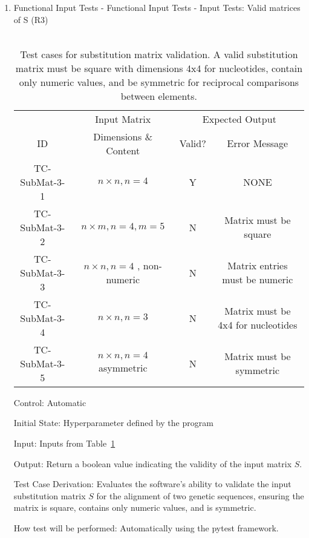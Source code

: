 \documentclass[12pt, titlepage]{article}
\begin{document}
\begin{enumerate}
\newpage

\item{Functional Input Tests - Functional Input Tests - Input Tests: Valid matrices of S (R3)\\\\}

\begin{table}[h]
  \begin{tabular}{|c|c|c c|}
  \hline 
    & Input Matrix & \multicolumn{2}{c|}{Expected Output} \\
  \cline{2-4}
  ID & Dimensions \& Content & Valid? & Error Message \\
  \hline
  TC-SubMat-3-1 & $n \times n, n=4$ & Y & NONE \\
  \hline
  TC-SubMat-3-2 & $n \times m, n=4, m=5$ & N & Matrix must be square \\
  \hline
  TC-SubMat-3-3 & $n \times n, n=4$ , non-numeric & N & Matrix entries must be numeric \\
  \hline
  TC-SubMat-3-4 & $n \times n, n=3$ & N & Matrix must be 4x4 for nucleotides \\
  \hline
  TC-SubMat-3-5 & $n \times n, n=4$ asymmetric & N & Matrix must be symmetric \\
  \hline
  \end{tabular}
  \caption{Test cases for substitution matrix validation. A valid substitution matrix must be square with dimensions 4x4 for nucleotides,
  contain only numeric values, and be symmetric for reciprocal comparisons between elements.}
  \label{tab:test-case-3}
\end{table}

Control: Automatic
					
Initial State: Hyperparameter defined by the program 
					
Input: Inputs from Table~\ref{tab:test-case-3} 

					
Output: Return a boolean value indicating the validity of the input matrix $S$.

Test Case Derivation: Evaluates the software's ability to validate the input substitution matrix $S$ for the
alignment of two genetic sequences, ensuring the matrix is square, contains only numeric values, and is symmetric.


How test will be performed: Automatically using the pytest framework.

\end{enumerate}
\end{document}
